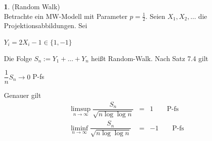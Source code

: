 \documentclass[10pt,a4paper]{report}
\numberwithin{equation}{section}
\numberwithin{figure}{section}
\theoremstyle{plain}
\theoremstyle{definition}
\theoremstyle{plain}
\theoremstyle{definition}
\newtheorem{example}{\protect\examplename}[section]
\theoremstyle{remark}
\theoremstyle{plain}
\theoremstyle{plain}
\theoremstyle{plain}
\theoremstyle{plain}
\theoremstyle{plain}
\providecommand{\examplename}{Beispiel}
\newcommand{\1}{ \mathbb{1} } %
\begin{document}
\begin{example} (Random Walk) \\
  Betrachte ein MW-Modell mit Parameter $p=\frac{1}{2}$. Seien
  $X_1,X_2,\ldots$ die Projektionsabbildungen. Sei
  \begin{center}
    $Y_i=2X_i-1 \in \{1,-1\}$
  \end{center}
  Die Folge $S_n:=Y_1+\ldots+Y_n$ heißt Random-Walk. Nach Satz 7.4
  gilt
  \begin{center}
    $\dfrac{1}{n}S_n \to 0$ P-fs
  \end{center}
  Genauer gilt
  \begin{eqnarray*}
    \limsup\limits_{n \to\infty}\dfrac{S_n}{\sqrt{n\log\log n}}&=& 1 \qquad \text{P-fs}\\
    \liminf\limits_{n \to\infty}\dfrac{S_n}{\sqrt{n\log\log n}}&=& -1 \qquad \text{P-fs}
  \end{eqnarray*}
\end{example}
\end{document}
